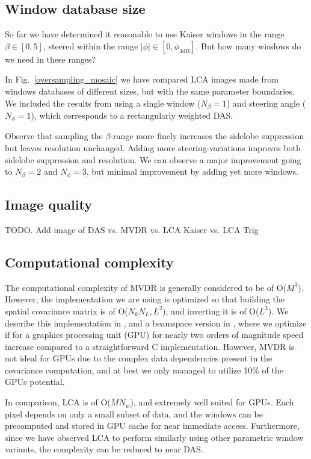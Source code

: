\documentclass[10pt,journal,draftclsnofoot,onecolumn]{IEEEtran}
\newcommand\Fig[1]{Fig.~\ref{#1}}
\newcommand\1{\vec 1}
\begin{document}
\subsection{Window database size}\label{lca_database_size}

So far we have determined it reasonable to use Kaiser windows in the range $\beta\in[0,5]$, steered within the range $|\phi|\in[0,\phi_\mathrm{3dB}]$. But how many windows do we need in these ranges?

In \Fig{oversampling_mosaic} we have compared LCA images made from windows databases of different sizes, but with the same parameter boundaries. We included the results from using a single window ($N_\beta=1$) and steering angle ($N_\phi=1$), which corresponds to a rectangularly weighted DAS.

Observe that sampling the $\beta$-range more finely increases the sidelobe suppression but leaves resolution unchanged. Adding more steering-variations improves both sidelobe suppression and resolution. We can observe a major improvement going to $N_\beta=2$ and $N_\phi=3$, but minimal improvement by adding yet more windows.


\subsection{Image quality}

TODO. Add image of DAS vs. MVDR vs. LCA Kaiser vs. LCA Trig

\subsection{Computational complexity}

The computational complexity of MVDR is generally considered to be of O($M^3$). However, the implementation we are using is optimized so that building the spatial covariance matrix is of O($N_kN_L,L^2$), and inverting it is of O($L^3$). We describe this implementation in \cite{Buskenes2014}, and a beamspace version in \cite{Asen2013}, where we optimize if for a graphics processing unit (GPU) for nearly two orders of magnitude speed increase compared to a straightforward C implementation. However, MVDR is not ideal for GPUs due to the complex data dependencies present in the covariance computation, and at best we only managed to utilize 10\% of the GPUs potential.

In comparison, LCA is of O($M N_w$), and extremely well suited for GPUs. Each pixel depends on only a small subset of data, and the windows can be precomputed and stored in GPU cache for near immediate access. Furthermore, since we have observed LCA to perform similarly using other parametric window variants, the complexity can be reduced to near DAS.
\end{document}
